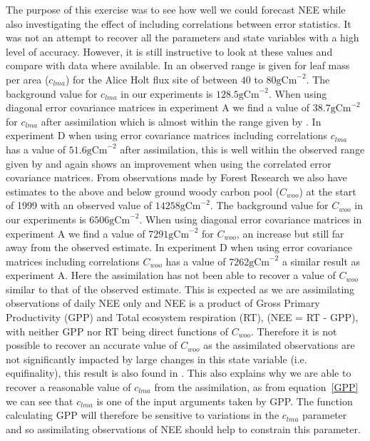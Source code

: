 \documentclass[review]{elsarticle}
\begin{document}
The purpose of this exercise was to see how well we could forecast NEE while also investigating the effect of including correlations between error statistics. It was not an attempt to recover all the parameters and state variables with a high level of accuracy. However, it is still instructive to look at these values and compare with data where available. In \citet{meir2002acclimation} an observed range is given for leaf mass per area ($c_{lma}$) for the Alice Holt flux site of between $40$ to $80 \text{gCm}^{-2}$. The background value for $c_{lma}$ in our experiments is $128.5 \text{gCm}^{-2}$. When using diagonal error covariance matrices in experiment A we find a value of $38.7\text{gCm}^{-2}$ for $c_{lma}$ after assimilation which is almost within the range given by \citet{meir2002acclimation}. In experiment D when using error covariance matrices including correlations $c_{lma}$ has a value of $51.6\text{gCm}^{-2}$ after assimilation, this is well within the observed range given by \citet{meir2002acclimation} and again shows an improvement when using the correlated error covariance matrices. From observations made by Forest Research we also have estimates to the above and below ground woody carbon pool ($C_{woo}$) at the start of 1999 with an observed value of $14258\text{gCm}^{-2}$. The background value for $C_{woo}$ in our experiments is $6506\text{gCm}^{-2}$. When using diagonal error covariance matrices in experiment A we find a value of $7291\text{gCm}^{-2}$ for $C_{woo}$, an increase but still far away from the observed estimate. In experiment D when using error covariance matrices including correlations $C_{woo}$ has a value of $7262\text{gCm}^{-2}$ a similar result as experiment A. Here the assimilation has not been able to recover a value of $C_{woo}$ similar to that of the observed estimate. This is expected as we are assimilating observations of daily NEE only and NEE is a product of Gross Primary Productivity (GPP) and Total ecosystem respiration (RT), (NEE = RT - GPP), with neither GPP nor RT being direct functions of $C_{woo}$. Therefore it is not possible to recover an accurate value of $C_{woo}$ as the assimilated observations are not significantly impacted by large changes in this state variable (i.e. equifinality), this result is also found in \citet{fox2009reflex}. This also explains why we are able to recover a reasonable value of $c_{lma}$ from the assimilation, as from equation~\eqref{GPP} we can see that $c_{lma}$ is one of the input arguments taken by GPP. The function calculating GPP will therefore be sensitive to variations in the $c_{lma}$ parameter and so assimilating observations of NEE should help to constrain this parameter.
\end{document}
